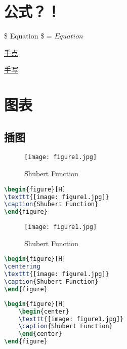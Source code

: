 \documentclass[a4paper,12pt]{article}
\begin{document}
\section{公式？！}
\$ Equation \$ = $ Equation $

\href{http://www.sciweavers.org/free-online-latex-equation-editor}{手点}


\href{http://webdemo.visionobjects.com/home.html;jsessionid=1mk45ecrnd2zk1l5x938b6sd4y?locale=zh_CN#equation}{手写}





\section{图表}
\subsection{插图}

\begin{figure}[H]
\texttt{[image: figure1.jpg]}
\caption{Shubert Function}
\end{figure}

\begin{lstlisting}[language=TeX,numbers=none,frame=lrtb,keywords={begin},label=Gamma,caption=Gamma]
\begin{figure}[H]
\texttt{[image: figure1.jpg]}
\caption{Shubert Function}
\end{figure}
\end{lstlisting}

\begin{figure}[H]
\centering
\texttt{[image: figure1.jpg]}
\caption{Shubert Function}
\end{figure}

\begin{lstlisting}[language=TeX,numbers=none,frame=lrtb,keywords={begin},label=Gamma,caption=Gamma]
\begin{figure}[H]
\centering
\texttt{[image: figure1.jpg]}
\caption{Shubert Function}
\end{figure}
\end{lstlisting}
\begin{lstlisting}[language=TeX,numbers=none,frame=lrtb,keywords={begin},label=Gamma,caption=Gamma]
\begin{figure}[H]
	\begin{center}
	\texttt{[image: figure1.jpg]}
	\caption{Shubert Function}
	\end{center}
\end{figure}
\end{lstlisting}
\end{document}
